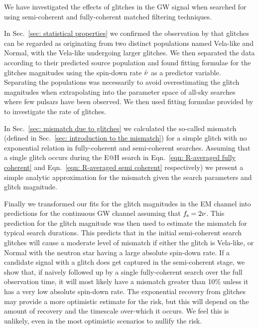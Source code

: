 \documentclass[../full_thesis/full_thesis.tex]{subfiles}
\begin{document}
We have investigated the effects of glitches in the GW signal when searched for
using semi-coherent and fully-coherent matched filtering techniques.

In Sec.~\ref{sec: statistical properties} we confirmed the observation by
\citet{Espinoza2011} that glitches can be regarded as originating from two
distinct populations named Vela-like and Normal, with the Vela-like undergoing
larger glitches. We then separated the data according to their predicted source
population and found fitting formulae for the glitches magnitudes using the
spin-down rate $\dot{\nu}$ as a predictor variable. Separating the populations
was necessarily to avoid overestimating the glitch magnitudes when
extrapolating into the parameter space of all-sky searches where few pulsars
have been observed. We then used fitting formulae provided by
\citet{Espinoza2011} to investigate the rate of glitches.

In Sec.~\ref{sec: mismatch due to glitches} we calculated the so-called
mismatch (defined in Sec.~\ref{sec: introduction to the mismatch}) for a simple
glitch with no exponential relation in fully-coherent and semi-coherent
searches. Assuming that a single glitch occurs during the E@H search
in Eqn.~\eqref{eqn: R-averaged fully coherent} and Eqn.~\eqref{eqn:
R-averaged semi coherent} respectively) we present a simple analytic approximation
for the mismatch given the search parameters and glitch magnitude.

Finally we transformed our fits for the glitch magnitudes in the EM channel
into predictions for the continuous GW channel assuming that $f_{\textrm{s}}=2\nu$. This
prediction for the glitch magnitude was then used to estimate the mismatch for
typical search durations. This predicts that in the initial
semi-coherent search glitches will cause a moderate level of mismatch if
either the glitch is Vela-like, or Normal with the neutron star having a large
absolute spin-down rate.  If a candidate signal with a glitch does get captured
in the semi-coherent stage, we show that, if naively followed up by a single
fully-coherent search over the full observation time, it will most likely have
a mismatch greater than 10\% unless it has a very low absolute spin-down rate.
The exponential recovery from glitches may provide a more optimistic estimate
for the risk, but this will depend on the amount of recovery and the timescale
over-which it occurs. We feel this is unlikely, even in the most optimistic
scenarios to nullify the risk.
\end{document}
